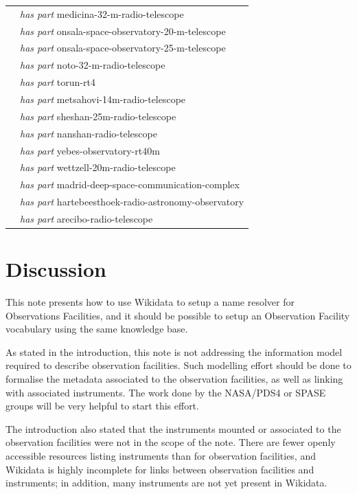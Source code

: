 \documentclass[11pt,a4paper]{ivoa}
\begin{document}
{\begin{longtable}{p{}p{}}
                        & \emph{has part} medicina-32-m-radio-telescope\\
                        & \emph{has part} onsala-space-observatory-20-m-telescope\\
                        & \emph{has part} onsala-space-observatory-25-m-telescope\\
                        & \emph{has part} noto-32-m-radio-telescope\\
                        & \emph{has part} torun-rt4\\
                        & \emph{has part} metsahovi-14m-radio-telescope\\
                        & \emph{has part} sheshan-25m-radio-telescope\\
                        & \emph{has part} nanshan-radio-telescope\\
                        & \emph{has part} yebes-observatory-rt40m\\
                        & \emph{has part} wettzell-20m-radio-telescope\\
                        & \emph{has part} madrid-deep-space-communication-complex\\
                        & \emph{has part} hartebeesthoek-radio-astronomy-observatory\\
                        & \emph{has part} arecibo-radio-telescope\\
\hline
\end{longtable}}

\section{Discussion}
This note presents how to use Wikidata to setup a name resolver 
for Observations Facilities, and it should be possible to setup 
an Observation Facility vocabulary using the same knowledge base.

As stated in the introduction, this note is not addressing the 
information model required to describe observation facilities. 
Such modelling effort should be done to formalise the metadata 
associated to the observation facilities, as well as linking 
with associated instruments. The work done by the NASA/PDS4 or
SPASE groups will be very helpful to start this effort. 

The introduction also stated that the instruments mounted or 
associated to the observation facilities were not in the scope
of the note. There are fewer openly accessible resources
listing instruments than for observation facilities, and 
Wikidata is highly incomplete for links between observation facilities
and instruments; in addition, many instruments
are not yet present in Wikidata.
\end{document}
